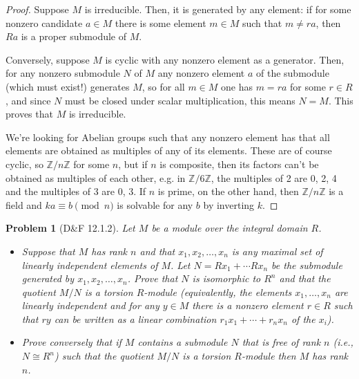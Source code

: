 \documentclass{article}
\newtheorem{plm}{Problem}
\begin{document}
\begin{proof}
  Suppose $M$ is irreducible.
  Then, it is generated by any element: if for some nonzero candidate $a \in M$ there is some element $m \in M$ such that $m \neq ra$,
  then $Ra$ is a proper submodule of $M$.

  Conversely, suppose $M$ is cyclic with any nonzero element as a generator.
  Then, for any nonzero submodule $N$ of $M$ any nonzero element $a$ of the submodule (which must exist!) generates $M$,
  so for all $m \in M$ one has $m = ra$ for some $r \in R$, and since $N$ must be closed under scalar multiplication, this means $N = M$.
  This proves that $M$ is irreducible.

  We're looking for Abelian groups such that any nonzero element has that all elements are obtained as multiples of any of its elements.
  These are of course cyclic, so $\mathbb{Z} / n\mathbb{Z}$ for some $n$, but if $n$ is composite,
  then its factors can't be obtained as multiples of each other, e.g. in $\mathbb{Z} / 6\mathbb{Z}$, the multiples of 2 are 0, 2, 4
  and the multiples of 3 are 0, 3.
  If $n$ is prime, on the other hand, then $\mathbb{Z} / n\mathbb{Z}$ is a field and $ka \equiv b\pmod n$ is solvable for any $b$ by inverting $k$.



\end{proof}

\begin{plm}[D\&F 12.1.2]
  Let $M$ be a module over the integral domain $R$.
  \begin{itemize}
  \item Suppose that $M$ has rank $n$ and that $x_{1}, x_{2}, \ldots, x_{n}$ is any maximal set of linearly independent elements of $M$.
    Let $N = Rx_{1} + \cdots Rx_{n}$ be the submodule generated by $x_{1}, x_{2}, \ldots, x_{n}$.
    Prove that $N$ is isomorphic to $R^{n}$ and that the quotient $M / N$ is a torsion $R$-module (equivalently, the elements $x_{1}, \ldots, x_{n}$
    are linearly independent and for any $y \in M$ there is a nonzero element $r \in R$ such that $ry$ can be written as a linear combination
    $r_{1}x_{1} + \cdots + r_{n}x_{n}$ of the $x_{i}$).
  \item Prove conversely that if $M$ contains a submodule $N$ that is free of rank $n$ (i.e., $N \cong R^{n}$) such that the quotient $M / N$
    is a torsion $R$-module then $M$ has rank $n$.
  \end{itemize}
\end{plm}
\end{document}
